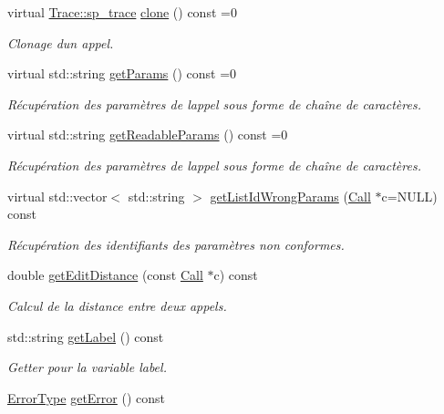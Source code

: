 \begin{DoxyCompactItemize}
virtual \hyperlink{class_trace_a9c58e523529fc8a03fb6acf3eef86150}{Trace\+::sp\+\_\+trace} \hyperlink{class_call_ab3bf0965d35eb1e97ecddaf2d3978e9b}{clone} () const  =0
\begin{DoxyCompactList}\small\item\em Clonage d\textquotesingle{}un appel. \end{DoxyCompactList}\item 
virtual std\+::string \hyperlink{class_call_af77d25bd64b8a89750950c872cec1a8c}{get\+Params} () const  =0
\begin{DoxyCompactList}\small\item\em Récupération des paramètres de l\textquotesingle{}appel sous forme de chaîne de caractères. \end{DoxyCompactList}\item 
virtual std\+::string \hyperlink{class_call_a3b0d9700a627280d86af88ef128f2f83}{get\+Readable\+Params} () const  =0
\begin{DoxyCompactList}\small\item\em Récupération des paramètres de l\textquotesingle{}appel sous forme de chaîne de caractères. \end{DoxyCompactList}\item 
virtual std\+::vector$<$ std\+::string $>$ \hyperlink{class_call_a0c1f026fe71ef9faaab3bfdf6e954f40}{get\+List\+Id\+Wrong\+Params} (\hyperlink{class_call}{Call} $\ast$c=N\+U\+LL) const 
\begin{DoxyCompactList}\small\item\em Récupération des identifiants des paramètres non conformes. \end{DoxyCompactList}\item 
double \hyperlink{class_call_aa184f73d80fafba5e1a8c78007bfd01a}{get\+Edit\+Distance} (const \hyperlink{class_call}{Call} $\ast$c) const 
\begin{DoxyCompactList}\small\item\em Calcul de la distance entre deux appels. \end{DoxyCompactList}\item 
std\+::string \hyperlink{class_call_a42f1632ea1ae777b469a5ce60bce6557}{get\+Label} () const 
\begin{DoxyCompactList}\small\item\em Getter pour la variable {\ttfamily label}. \end{DoxyCompactList}\item 
\hyperlink{class_call_ade833a08ce215aaa4121102f3448c898}{Error\+Type} \hyperlink{class_call_a7d624f62e2e404da13441057bb0b7807}{get\+Error} () const 

\end{DoxyCompactItemize}
